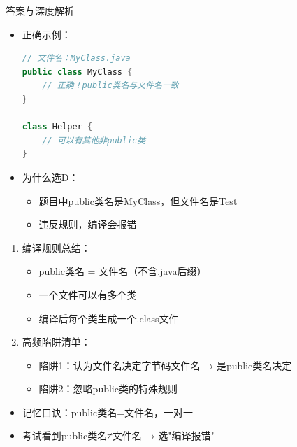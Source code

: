 \documentclass[12pt, a4paper]{ctexart}
\begin{document}
\begin{enumerate}[label=\textbf{\arabic*.}]
\begin{bluebox}{答案与深度解析}
\begin{itemize}[leftmargin=*, nosep]
			      \item 正确示例：
			            \begin{lstlisting}[language=Java]
// 文件名：MyClass.java
public class MyClass {
    // 正确！public类名与文件名一致
}

class Helper {
    // 可以有其他非public类
}
      \end{lstlisting}

			      \item 为什么选D：
			            \begin{itemize}
				            \item 题目中public类名是MyClass，但文件名是Test
				            \item 违反规则，编译会报错
			            \end{itemize}
		      \end{itemize}

		      \begin{enumerate}[leftmargin=*, nosep]
			      \item 编译规则总结：
			            \begin{itemize}
				            \item {public类名 = 文件名（不含.java后缀）}
				            \item 一个文件可以有多个类
				            \item 编译后每个类生成一个.class文件
			            \end{itemize}

			      \item 高频陷阱清单：
			            \begin{itemize}
				            \item 陷阱1：认为文件名决定字节码文件名 → 是public类名决定
				            \item 陷阱2：忽略public类的特殊规则
			            \end{itemize}
		      \end{enumerate}

		      \begin{itemize}
			      \item {记忆口诀：public类名=文件名，一对一}
			      \item 考试看到public类名≠文件名 → 选"编译报错"
		      \end{itemize}
	      \end{bluebox}


\end{enumerate}
\end{document}
